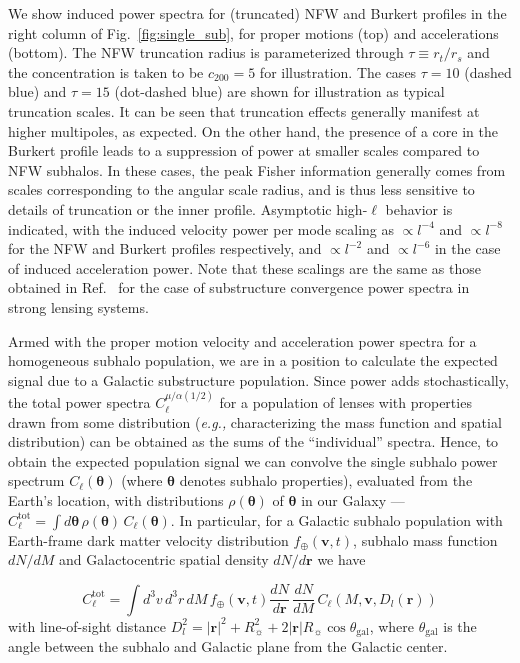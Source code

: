 \documentclass[twocolumn]{aastex63}
\newcommand{\vect}[1]{\boldsymbol{\mathbf{#1}}}
\begin{document}
We show induced power spectra for (truncated) NFW and Burkert profiles in the right column of Fig.~\ref{fig:single_sub}, for proper motions (top) and accelerations (bottom). The NFW truncation radius is parameterized through $\tau\equiv r_t/r_s$ and the concentration is taken to be $c_{200}=5$ for illustration. The cases $\tau=10$ (dashed blue) and $\tau=15$ (dot-dashed blue) are shown for illustration as typical truncation scales. It can be seen that truncation effects generally manifest at higher multipoles, as expected. On the other hand, the presence of a core in the Burkert profile leads to a suppression of power at smaller scales compared to NFW subhalos. In these cases, the peak Fisher information generally comes from scales corresponding to the angular scale radius, and is thus less sensitive to details of truncation or the inner profile. Asymptotic high-$\ell$ behavior is indicated, with the induced velocity power per mode scaling as $\propto l^{-4}$ and $\propto l^{-8}$ for the NFW and Burkert profiles respectively, and $\propto l^{-2}$ and $\propto l^{-6}$ in the case of induced acceleration power. Note that these scalings are the same as those obtained in Ref.~\cite{Rivero:2017mao} for the case of substructure convergence power spectra in strong lensing systems. 

Armed with the proper motion velocity and acceleration power spectra for a homogeneous subhalo population, we are in a position to calculate the expected signal due to a Galactic substructure population. Since power adds stochastically, the total power spectra $C_\ell^{\mu/\alpha(1/2)}$ for a population of lenses with properties drawn from some distribution (\emph{e.g.,} characterizing the mass function and spatial distribution) can be obtained as the sums of the ``individual'' spectra. Hence, to obtain the expected population signal we can convolve the single subhalo power spectrum $C_\ell(\boldsymbol \theta)$ (where $\boldsymbol \theta$ denotes subhalo properties), evaluated from the Earth's location, with distributions $\rho(\vect{\theta})$ of $\boldsymbol \theta$ in our Galaxy --- $C_\ell^{\mathrm{tot}}=\int d\vect\theta\,\rho(\vect{\theta})\,C_\ell(\boldsymbol \theta)$. In particular, for a Galactic subhalo population with Earth-frame dark matter velocity distribution $f_\oplus(\mathbf v, t)$, subhalo mass function ${dN}/{dM}$ and Galactocentric spatial density ${dN}/{d{\mathbf r}}$ we have 

\begin{equation}
C_\ell^{\mathrm{tot}}=\int d^3v\,d^3r\,dM\,f_\oplus(\mathbf v, t) \frac{dN}{d{\mathbf r}}\,\frac{dN}{dM}\,C_\ell(M, \mathbf{v}, D_l(\mathbf{r}))
\label{eqn:popcell}
\end{equation}
with line-of-sight distance $D_l^2 = |\vect{r}|^2 + R_\sun^2 +2|\vect{r}|R_\sun\cos\theta_\mathrm{gal}$, where $\theta_\mathrm{gal}$ is the angle between the subhalo and Galactic plane from the Galactic center. 
\end{document}

